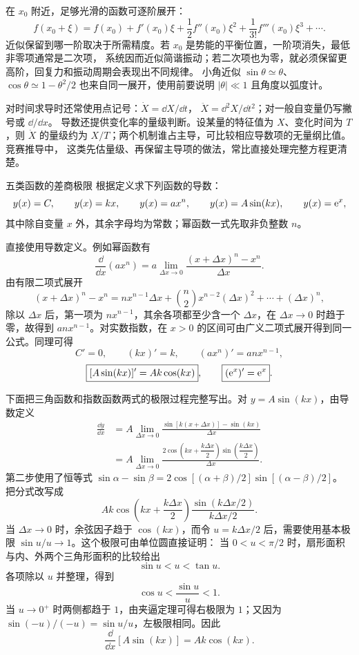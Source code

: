 {在 $x_0$ 附近，足够光滑的函数可逐阶展开：
\[
 f(x_0+\xi)=f(x_0)+f'(x_0)\xi+
 \frac12f''(x_0)\xi^2+\frac1{3!}f'''(x_0)\xi^3+\cdots .
\]
近似保留到哪一阶取决于所需精度。若 $x_0$ 是势能的平衡位置，一阶项消失，最低非零项通常是二次项，
系统因而近似简谐振动；若二次项也为零，就必须保留更高阶，回复力和振动周期会表现出不同规律。
小角近似 $\sin\theta\simeq\theta$、$\cos\theta\simeq1-\theta^2/2$ 也来自同一展开，使用前要说明
$|\theta|\ll1$ 且角度以弧度计。

对时间求导时还常使用点记号：$\dot X=\dd X/\dd t$，
$\ddot X=\dd^2X/\dd t^2$；对一般自变量仍写撇号或 $\dd/\dd x$。
导数还提供变化率的量级判断。设某量的特征值为 $X$、变化时间为 $T$，则
$\dot X$ 的量级约为 $X/T$；两个机制谁占主导，可比较相应导数项的无量纲比值。竞赛推导中，
这类先估量级、再保留主导项的做法，常比直接处理完整方程更清楚。


\begin{origexamplebox}{五类函数的差商极限}\label{ch01:ex:s14-1-1}
根据定义求下列函数的导数：
\[
 y(x)=C,\qquad y(x)=kx,\qquad y(x)=ax^n,\qquad
 y(x)=A\sin(kx),\qquad y(x)=\mathrm e^x,
\]
其中除自变量 $x$ 外，其余字母均为常数；幂函数一式先取非负整数 $n$。

\end{origexamplebox}

\begin{xesolution}
直接使用导数定义。例如幂函数有
\[
 \frac{\dd}{\dd x}(ax^n)
 =a\lim_{\Delta x\to0}
 \frac{(x+\Delta x)^n-x^n}{\Delta x}.
\]
由有限二项式展开
\[
 (x+\Delta x)^n-x^n
 =nx^{n-1}\Delta x+\binom n2x^{n-2}(\Delta x)^2+\cdots+(\Delta x)^n,
\]
除以 $\Delta x$ 后，第一项为 $nx^{n-1}$，其余各项都至少含一个 $\Delta x$，在
$\Delta x\to0$ 时趋于零，故得到 $anx^{n-1}$。对实数指数，在 $x>0$ 的区间可由广义二项式展开得到同一公式。同理可得
\[
 \boxed{C'=0},\qquad
 \boxed{(kx)'=k},\qquad
 \boxed{(ax^n)'=anx^{n-1}},
\]
\[
 \boxed{[A\sin(kx)]'=Ak\cos(kx)},\qquad
 \boxed{(\mathrm e^x)'=\mathrm e^x}.
\]

下面把三角函数和指数函数两式的极限过程完整写出。对 $y=A\sin(kx)$，由导数定义
\begin{align*}
 \frac{\dd y}{\dd x}
 &=A\lim_{\Delta x\to0}
 \frac{\sin[k(x+\Delta x)]-\sin(kx)}{\Delta x}\\
 &=A\lim_{\Delta x\to0}
 \frac{2\cos\!\left(kx+\dfrac{k\Delta x}{2}\right)
       \sin\!\left(\dfrac{k\Delta x}{2}\right)}{\Delta x}.
\end{align*}
第二步使用了恒等式
$\sin\alpha-\sin\beta
=2\cos[(\alpha+\beta)/2]\sin[(\alpha-\beta)/2]$。
把分式改写成
\[
 Ak\cos\!\left(kx+\frac{k\Delta x}{2}\right)
 \frac{\sin(k\Delta x/2)}{k\Delta x/2}.
\]
当 $\Delta x\to0$ 时，余弦因子趋于 $\cos(kx)$，而令
$u=k\Delta x/2$ 后，需要使用基本极限 $\sin u/u\to1$。这个极限可由单位圆直接证明：
当 $0<u<\pi/2$ 时，扇形面积与内、外两个三角形面积的比较给出
\[
 \sin u<u<\tan u.
\]
各项除以 $u$ 并整理，得到
\[
 \cos u<\frac{\sin u}{u}<1.
\]
当 $u\to0^+$ 时两侧都趋于 $1$，由夹逼定理可得右极限为 $1$；又因为
$\sin(-u)/(-u)=\sin u/u$，左极限相同。因此
\[
 \frac{\dd}{\dd x}[A\sin(kx)]=Ak\cos(kx).
\]


\end{xesolution}}
